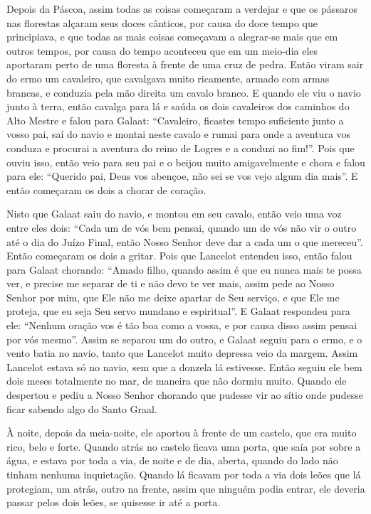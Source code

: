 Depois da Páscoa, assim todas as coisas começaram a verdejar e que os pássaros
nas florestas alçaram seus doces cânticos, por causa do doce tempo que
principiava, e que todas as mais coisas começavam a alegrar-se mais que em
outros tempos, por causa do tempo aconteceu que em um meio-dia eles aportaram
perto de uma floresta à frente de uma cruz de pedra. Então viram sair do ermo
um cavaleiro, que cavalgava muito ricamente, armado com armas brancas, e
conduzia pela mão direita um cavalo branco. E quando ele viu o navio junto à
terra, então cavalga para lá e saúda os dois cavaleiros dos caminhos do Alto
Mestre e falou para Galaat: “Cavaleiro, ficastes tempo suficiente junto a vosso
pai, saí do navio e montai neste cavalo e rumai para onde a aventura vos
conduza e procurai a aventura do reino de Logres e a conduzi ao fim!”. Pois que
ouviu isso, então veio para seu pai e o beijou muito amigavelmente e chora e
falou para ele: “Querido pai, Deus vos abençoe, não sei se vos vejo algum dia
mais”. E então começaram os dois a chorar de coração.

Nisto que Galaat saiu do navio, e montou em seu cavalo, então veio uma voz entre
eles dois: “Cada um de vós bem pensai, quando um de vós não vir o outro até o
dia do Juízo Final, então Nosso Senhor deve dar a cada um o que mereceu”. 
Então começaram os dois a gritar. Pois que Lancelot entendeu isso, então
falou para Galaat chorando: “Amado filho, quando assim é que eu nunca mais te
possa ver, e precise me separar de ti e não devo te ver mais, assim pede ao
Nosso Senhor por mim, que Ele não me deixe apartar de Seu serviço, e que Ele me
proteja, que eu seja Seu servo mundano e espiritual”. E Galaat respondeu para
ele: “Nenhum oração vos é tão boa como a vossa, e por causa disso assim pensai
por vós mesmo”. Assim se separou um do outro, e Galaat seguiu para o ermo, e o
vento batia no navio, tanto que Lancelot muito depressa veio da margem. Assim
Lancelot estava só no navio, sem que a donzela lá estivesse. Então seguiu ele
bem dois meses totalmente no mar, de maneira que não dormiu muito. Quando ele
despertou e pediu a Nosso Senhor chorando que pudesse vir ao sítio onde pudesse
ficar sabendo algo do Santo Graal. 

À noite, depois da meia-noite, ele aportou à frente de um castelo, que era muito
rico, belo e forte. Quando atrás no castelo ficava uma porta, que saía por
sobre a água, e estava por toda a via, de noite e de dia, aberta, quando do
lado não tinham nenhuma inquietação. Quando lá ficavam por toda a via dois
leões que lá protegiam, um atrás, outro na frente, assim que ninguém podia
entrar, ele deveria passar pelos dois leões, se quisesse ir até a porta.

